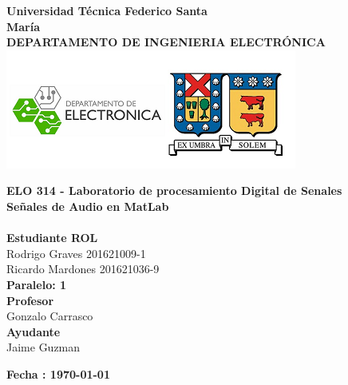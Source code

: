 \documentclass[12pt,a4paper]{article} %
\begin{document}
\begin{titlepage}
\begin{center}
\textbf{\LARGE Universidad Técnica Federico Santa}\\[0.25cm]
\textbf{\LARGE María}\\[0.5cm]
\textbf{\large DEPARTAMENTO DE INGENIERIA ELECTRÓNICA}\\[0.2cm]
\vspace{20pt}
\includegraphics{logousm.png}\\[1cm]

\par
\vspace{15pt}
\textbf{\Large ELO 314 - Laboratorio de procesamiento Digital de Senales}\\
\vspace{15pt}
\myrule[1pt][7pt]
\textbf{\LARGE  Señales de Audio en MatLab}\\[0.25cm]
\vspace{15pt}
\textbf{\large  }\\
\myrule[1pt][7pt]
\vspace{55pt}
\textbf{\large Estudiante \hspace{75pt} ROL}\\
    \hspace{0pt}Rodrigo Graves\hspace{75pt} 201621009-1 \\
     Ricardo Mardones      \hspace{60pt} 201621036-9 \\
   


\vspace{30pt}
\textbf{\large Paralelo: \hspace{30pt} 1}\\

\vspace{35pt}
\textbf {\large Profesor}\\[0.2cm]
\Large { Gonzalo Carrasco}\\[0.1cm]
\textbf {\large Ayudante}\\[0.2cm]
\Large {Jaime Guzman}\\[0.1cm]
\end{center}

\par
\vfill
\begin{center}
\textbf{Fecha : \today}\\
\end{center}

\end{titlepage}
\end{document}
